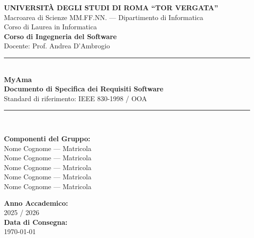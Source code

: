 \documentclass[12pt,a4paper]{article}
\begin{document}
\begin{titlepage}
    \centering
    \vspace*{1cm}
    
    {\Large \textbf{UNIVERSITÀ DEGLI STUDI DI ROMA ``TOR VERGATA''}}\\[0.3cm]
    {\large Macroarea di Scienze MM.FF.NN. --- Dipartimento di Informatica}\\[0.2cm]
    {\large Corso di Laurea in Informatica}\\[1.5cm]
    
    {\large \textbf{Corso di Ingegneria del Software}}\\[0.2cm]
    {\normalsize Docente: Prof. Andrea D'Ambrogio}\\[1.5cm]
    
    \rule{\linewidth}{0.8mm}\\[0.5cm]
    {\Huge \textbf{MyAma}}\\[0.3cm]
    {\Large \textbf{Documento di Specifica dei Requisiti Software}}\\[0.2cm]
    {\normalsize Standard di riferimento: IEEE 830-1998 / OOA}\\[0.5cm]
    \rule{\linewidth}{0.8mm}\\[2cm]
    
    \begin{minipage}{0.5\textwidth}
        \begin{flushleft} \large
            \textbf{Componenti del Gruppo:}\\
            Nome Cognome --- Matricola\\
            Nome Cognome --- Matricola\\
            Nome Cognome --- Matricola\\
            Nome Cognome --- Matricola\\
            Nome Cognome --- Matricola
        \end{flushleft}
    \end{minipage}
    \hfill
    \begin{minipage}{0.4\textwidth}
        \begin{flushright} \large
            \textbf{Anno Accademico:}\\
            2025 / 2026\\[1cm]
            \textbf{Data di Consegna:}\\
            \today
        \end{flushright}
    \end{minipage}
    
    \vfill
\end{titlepage}
\end{document}
